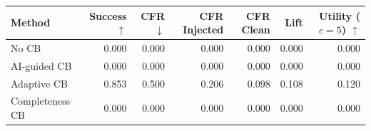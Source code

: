 \begin{tabular}{lrrrrrr}
\toprule
Method & Success $\uparrow$ & CFR $\downarrow$ & CFR Injected & CFR Clean & Lift & Utility ($c=5$) $\uparrow$ \\
\midrule
No CB & 0.000 & 0.000 & 0.000 & 0.000 & 0.000 & 0.000 \\
AI-guided CB & 0.000 & 0.000 & 0.000 & 0.000 & 0.000 & 0.000 \\
Adaptive CB & 0.853 & 0.500 & 0.206 & 0.098 & 0.108 & 0.120 \\
Completeness CB & 0.000 & 0.000 & 0.000 & 0.000 & 0.000 & 0.000 \\
\bottomrule
\end{tabular}
